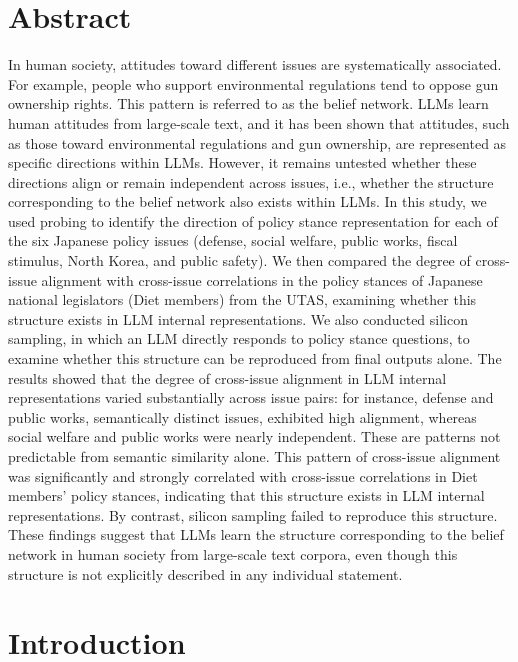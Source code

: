 \documentclass[10pt,letterpaper]{article}
\begin{document}
\section*{Abstract}
In human society, attitudes toward different issues are systematically associated. For example, people who support environmental regulations tend to oppose gun ownership rights. This pattern is referred to as the belief network. LLMs learn human attitudes from large-scale text, and it has been shown that attitudes, such as those toward environmental regulations and gun ownership, are represented as specific directions within LLMs. However, it remains untested whether these directions align or remain independent across issues, i.e., whether the structure corresponding to the belief network also exists within LLMs. In this study, we used probing to identify the direction of policy stance representation for each of the six Japanese policy issues (defense, social welfare, public works, fiscal stimulus, North Korea, and public safety). We then compared the degree of cross-issue alignment with cross-issue correlations in the policy stances of Japanese national legislators (Diet members) from the UTAS, examining whether this structure exists in LLM internal representations. We also conducted silicon sampling, in which an LLM directly responds to policy stance questions, to examine whether this structure can be reproduced from final outputs alone. The results showed that the degree of cross-issue alignment in LLM internal representations varied substantially across issue pairs: for instance, defense and public works, semantically distinct issues, exhibited high alignment, whereas social welfare and public works were nearly independent. These are patterns not predictable from semantic similarity alone. This pattern of cross-issue alignment was significantly and strongly correlated with cross-issue correlations in Diet members' policy stances, indicating that this structure exists in LLM internal representations. By contrast, silicon sampling failed to reproduce this structure. These findings suggest that LLMs learn the structure corresponding to the belief network in human society from large-scale text corpora, even though this structure is not explicitly described in any individual statement.


\linenumbers

\section*{Introduction}
\end{document}
